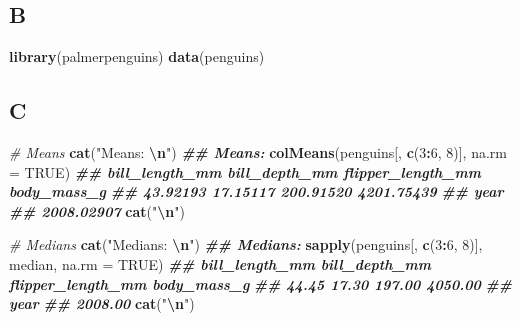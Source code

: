 \documentclass[
]{article}
\newenvironment{Shaded}{\begin{snugshade}}{\end{snugshade}}
\newcommand{\AttributeTok}[1]{\textcolor[rgb]{0.13,0.29,0.53}{#1}}
\newcommand{\CommentTok}[1]{\textcolor[rgb]{0.56,0.35,0.01}{\textit{#1}}}
\newcommand{\ConstantTok}[1]{\textcolor[rgb]{0.56,0.35,0.01}{#1}}
\newcommand{\DecValTok}[1]{\textcolor[rgb]{0.00,0.00,0.81}{#1}}
\newcommand{\DocumentationTok}[1]{\textcolor[rgb]{0.56,0.35,0.01}{\textbf{\textit{#1}}}}
\newcommand{\FunctionTok}[1]{\textcolor[rgb]{0.13,0.29,0.53}{\textbf{#1}}}
\newcommand{\NormalTok}[1]{#1}
\newcommand{\SpecialCharTok}[1]{\textcolor[rgb]{0.81,0.36,0.00}{\textbf{#1}}}
\newcommand{\StringTok}[1]{\textcolor[rgb]{0.31,0.60,0.02}{#1}}
\begin{document}
\hypertarget{b}{%
\subsection{B}\label{b}}

\begin{Shaded}
\begin{Highlighting}[]
\FunctionTok{library}\NormalTok{(palmerpenguins)}
\FunctionTok{data}\NormalTok{(penguins)}
\end{Highlighting}
\end{Shaded}

\hypertarget{c}{%
\subsection{C}\label{c}}

\begin{Shaded}
\begin{Highlighting}[]
\CommentTok{\# Means}
\FunctionTok{cat}\NormalTok{(}\StringTok{"Means: }\SpecialCharTok{\textbackslash{}n}\StringTok{"}\NormalTok{)}
\DocumentationTok{\#\# Means:}
\FunctionTok{colMeans}\NormalTok{(penguins[, }\FunctionTok{c}\NormalTok{(}\DecValTok{3}\SpecialCharTok{:}\DecValTok{6}\NormalTok{, }\DecValTok{8}\NormalTok{)], }\AttributeTok{na.rm =} \ConstantTok{TRUE}\NormalTok{)}
\DocumentationTok{\#\#    bill\_length\_mm     bill\_depth\_mm flipper\_length\_mm       body\_mass\_g }
\DocumentationTok{\#\#          43.92193          17.15117         200.91520        4201.75439 }
\DocumentationTok{\#\#              year }
\DocumentationTok{\#\#        2008.02907}
\FunctionTok{cat}\NormalTok{(}\StringTok{"}\SpecialCharTok{\textbackslash{}n}\StringTok{"}\NormalTok{)}

\CommentTok{\# Medians}
\FunctionTok{cat}\NormalTok{(}\StringTok{"Medians: }\SpecialCharTok{\textbackslash{}n}\StringTok{"}\NormalTok{)}
\DocumentationTok{\#\# Medians:}
\FunctionTok{sapply}\NormalTok{(penguins[, }\FunctionTok{c}\NormalTok{(}\DecValTok{3}\SpecialCharTok{:}\DecValTok{6}\NormalTok{, }\DecValTok{8}\NormalTok{)], median, }\AttributeTok{na.rm =} \ConstantTok{TRUE}\NormalTok{)}
\DocumentationTok{\#\#    bill\_length\_mm     bill\_depth\_mm flipper\_length\_mm       body\_mass\_g }
\DocumentationTok{\#\#             44.45             17.30            197.00           4050.00 }
\DocumentationTok{\#\#              year }
\DocumentationTok{\#\#           2008.00}
\FunctionTok{cat}\NormalTok{(}\StringTok{"}\SpecialCharTok{\textbackslash{}n}\StringTok{"}\NormalTok{)}


\end{Highlighting}
\end{Shaded}
\end{document}
